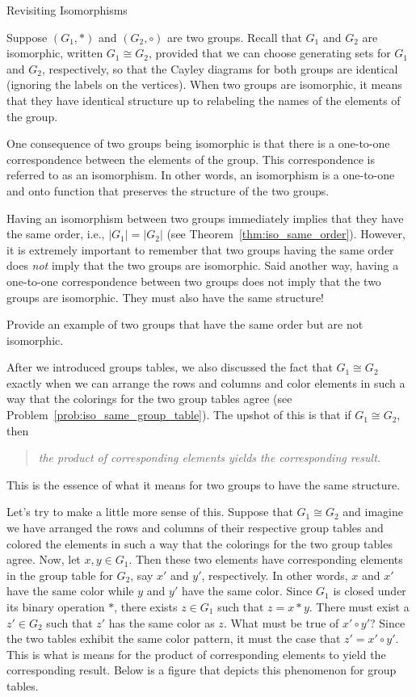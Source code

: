 \begin{section}{Revisiting Isomorphisms}

Suppose $(G_1,*)$ and $(G_2,\circ)$ are two groups.  Recall that $G_1$ and $G_2$ are isomorphic, written $G_1\cong G_2$, provided that we can choose generating sets for $G_1$ and $G_2$, respectively, so that the Cayley diagrams for both groups are identical (ignoring the labels on the vertices).  When two groups are isomorphic, it means that they have identical structure up to relabeling the names of the elements of the group.

One consequence of two groups being isomorphic is that there is a one-to-one correspondence between the elements of the group.  This correspondence is referred to as an isomorphism.  In other words, an isomorphism is a one-to-one and onto function that preserves the structure of the two groups.  

Having an isomorphism between two groups immediately implies that they have the same order, i.e., $|G_1|=|G_2|$ (see Theorem~\ref{thm:iso_same_order}).  However, it is extremely important to remember that two groups having the same order does \emph{not} imply that the two groups are isomorphic.  Said another way, having a one-to-one correspondence between two groups does not imply that the two groups are isomorphic.  They must also have the same structure!

\begin{exercise}
Provide an example of two groups that have the same order but are not isomorphic.
\end{exercise}

After we introduced groups tables, we also discussed the fact that $G_1\cong G_2$ exactly when we can arrange the rows and columns and color elements in such a way that the colorings for the two group tables agree (see Problem~\ref{prob:iso_same_group_table}).  The upshot of this is that if $G_1\cong G_2$, then
\begin{quotation}
\emph{the product of corresponding elements yields the corresponding result.}
\end{quotation}
This is the essence of what it means for two groups to have the same structure.  

Let's try to make a little more sense of this.  Suppose that $G_1\cong G_2$ and imagine we have arranged the rows and columns of their respective group tables and colored the elements in such a way that the colorings for the two group tables agree.  Now, let $x,y\in G_1$.  Then these two elements have corresponding elements in the group table for $G_2$, say $x'$ and $y'$, respectively.  In other words, $x$ and $x'$ have the same color while $y$ and $y'$ have the same color.  Since $G_1$ is closed under its binary operation $*$, there exists $z\in G_1$ such that $z=x*y$.  There must exist a $z'\in G_2$ such that $z'$ has the same color as $z$.  What must be true of $x'\circ y'$?  Since the two tables exhibit the same color pattern, it must the case that $z'=x'\circ y'$.  This is what is means for the product of corresponding elements to yield the corresponding result.  Below is a figure that depicts this phenomenon for group tables.


\end{section}
